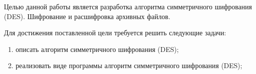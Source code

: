 %
%
%


Целью данной работы является разработка алгоритма симметричного шифрования (DES). Шифрование и расшифровка архивных файлов. 

Для достижения поставленной цели требуется решить следующие задачи:
\begin{enumerate}[label={\arabic*)}]
	\item описать алгоритм симметричного шифрования (DES);
	\item реализовать виде программы алгоритм симметричного шифрования (DES);
\end{enumerate}


\clearpage
